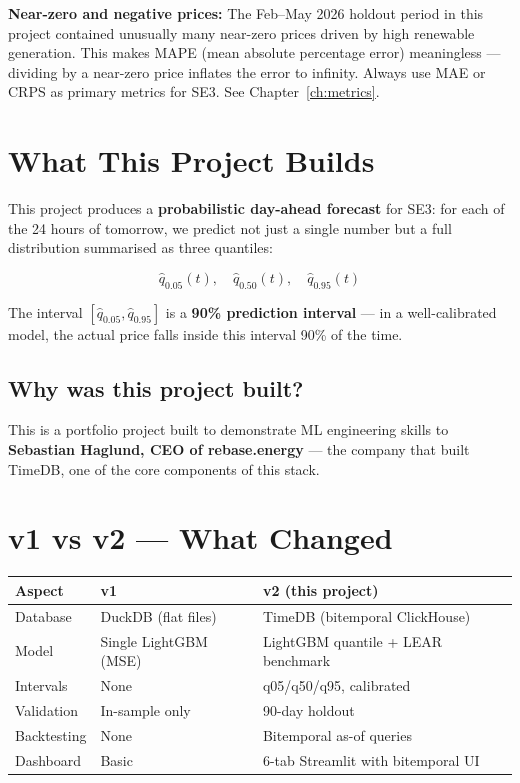 \documentclass[12pt, a4paper, oneside]{memoir}
\begin{document}
\begin{warningbox}
  \textbf{Near-zero and negative prices:} The Feb--May 2026 holdout period in this project
  contained unusually many near-zero prices driven by high renewable generation. This makes
  MAPE (mean absolute percentage error) meaningless --- dividing by a near-zero price inflates
  the error to infinity. Always use MAE or CRPS as primary metrics for SE3. See
  Chapter~\ref{ch:metrics}.
\end{warningbox}

\section{What This Project Builds}

This project produces a \textbf{probabilistic day-ahead forecast} for SE3: for each of
the 24 hours of tomorrow, we predict not just a single number but a full distribution
summarised as three quantiles:

\[
  \hat{q}_{0.05}(t),\quad \hat{q}_{0.50}(t),\quad \hat{q}_{0.95}(t)
\]

The interval $[\hat{q}_{0.05}, \hat{q}_{0.95}]$ is a \textbf{90\% prediction interval}
--- in a well-calibrated model, the actual price falls inside this interval 90\% of
the time.

\subsection*{Why was this project built?}
This is a portfolio project built to demonstrate ML engineering skills to
\textbf{Sebastian Haglund, CEO of rebase.energy} --- the company that built TimeDB,
one of the core components of this stack.

\section{v1 vs v2 --- What Changed}

\begin{center}
\begin{tabular}{lll}
\toprule
\textbf{Aspect} & \textbf{v1} & \textbf{v2 (this project)} \\
\midrule
Database        & DuckDB (flat files)      & TimeDB (bitemporal ClickHouse) \\
Model           & Single LightGBM (MSE)    & LightGBM quantile + LEAR benchmark \\
Intervals       & None                     & q05/q50/q95, calibrated \\
Validation      & In-sample only           & 90-day holdout \\
Backtesting     & None                     & Bitemporal as-of queries \\
Dashboard       & Basic                    & 6-tab Streamlit with bitemporal UI \\
\bottomrule
\end{tabular}
\end{center}
\end{document}
